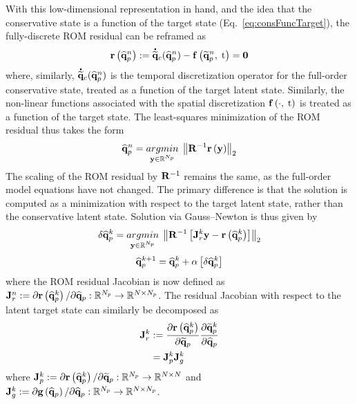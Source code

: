 With this low-dimensional representation in hand, and the idea that the conservative state is a function of the target state (Eq.~\ref{eq:consFuncTarget}), the fully-discrete ROM residual can be reframed as
%
\begin{equation}
    \mathbf{r}\left(\mathbf{\widehat{q}}_{p}^{n}\right) := \accentset{\mbox{\large\bfseries .}}{\mathbf{\widetilde{q}}}_{c}(\mathbf{\widehat{q}}_{p}^{n}) - \mathbf{f} \left(\mathbf{\widetilde{q}}_{p}^{n}, \; \text{t}\right) = \mathbf{0}
\end{equation}
%
where, similarly, $\accentset{\mbox{\large\bfseries .}}{\mathbf{\widetilde{q}}}_{c}(\mathbf{\widehat{q}}_{p}^{n})$ is the temporal discretization operator for the full-order conservative state, treated as a function of the target latent state. Similarly, the non-linear functions associated with the spatial discretization $ \mathbf{f} \left(\cdot, \; \text{t}\right)$ is treated as a function of the target state. The least-squares minimization of the ROM residual thus takes the form
%
\begin{equation}\label{eq:mplsvtLS}
    \primVecCoef^{\timeIdx} = \argmin{\dummyVec \inROne{\numPrimModes}} \left\Vert \resScaleInv \resFunc{\dummyVec} \right\Vert_2
\end{equation}
%
The scaling of the ROM residual by $\resScaleInv$ remains the same, as the full-order model equations have not changed. The primary difference is that the solution is computed as a minimization with respect to the target latent state, rather than the conservative latent state. Solution via Gauss--Newton is thus given by
%
\begin{equation}\label{eq:mplsvtLSLin}
    \delta \primVecCoef^{\newtonIdx} = \argmin{\dummyVec \inROne{\numPrimModes}} \left\Vert \resScaleInv \left[\jacobRes^{\newtonIdx} \dummyVec - \resFunc{\primVecCoef^{\newtonIdx}}\right] \right\Vert_2
\end{equation}
\begin{equation}
    \mathbf{\widehat{q}}_{p}^{k + 1} = \mathbf{\widehat{q}}_{p}^{k} + \alpha \left[ \delta \mathbf{\widehat{q}}_{p}^{k} \right]
\end{equation}
%
where the ROM residual Jacobian is now defined as $\mathbf{J}_{r}^{n} := \partial \mathbf{r}\left(\mathbf{\widehat{q}}_{p}^{k}\right) / \partial \mathbf{\widehat{q}}_{p}: \mathbb{R}^{N_p} \rightarrow \mathbb{R}^{N \times N_p}$. The residual Jacobian with respect to the latent target state can similarly be decomposed as
%
\begin{align}
    \mathbf{J}_{r}^{k} &:= \frac{\partial \mathbf{r}\left(\mathbf{\widehat{q}}_{p}^{k}\right)}{\partial \mathbf{\widetilde{q}}_{p}} \frac{\partial \mathbf{\widetilde{q}}_{p}^{k}}{\partial \mathbf{\widehat{q}}_{p}} \\
    &= \mathbf{J}_{p}^{k} \mathbf{J}_{g}^{k}
\end{align}
%
where $\mathbf{J}_{p}^{k} := \partial \mathbf{r}\left(\mathbf{\widehat{q}}_{p}^{k}\right) / \partial \mathbf{\widetilde{q}}_{p}: \mathbb{R}^{N_p} \rightarrow \mathbb{R}^{N \times N}$ and $\mathbf{J}_{g}^{k} := \partial \mathbf{g} \left(\mathbf{\widehat{q}}_{p}\right) / \partial \mathbf{\widehat{q}}_{p}: \mathbb{R}^{N_p} \rightarrow \mathbb{R}^{N \times N_p}$.

